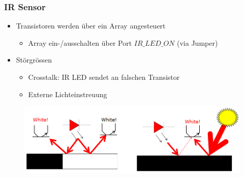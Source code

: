 \documentclass[usenames, dvipsnames]{beamer}
\begin{document}
\begin{frame}
	\frametitle{IR Sensor}
	\begin{itemize}
		\item{Transistoren werden über ein Array angesteuert}
		\begin{itemize}
			\item{Array ein-/ausschalten über Port $IR\_LED\_ON$ (via Jumper)}
		\end{itemize}
	\end{itemize}

	\begin{itemize}	
		\item{Störgrössen}
		\begin{itemize}
			\item{Crosstalk: IR LED sendet an falschen Transistor}
			\item{Externe Lichteinstreuung}
		\end{itemize}
	\end{itemize}

	\begin{figure}[h!]
		\centering
		\includegraphics[width=0.6\linewidth]{figure/linefollowing_disturbance.PNG}
	\end{figure}
\end{frame}


\end{document}
